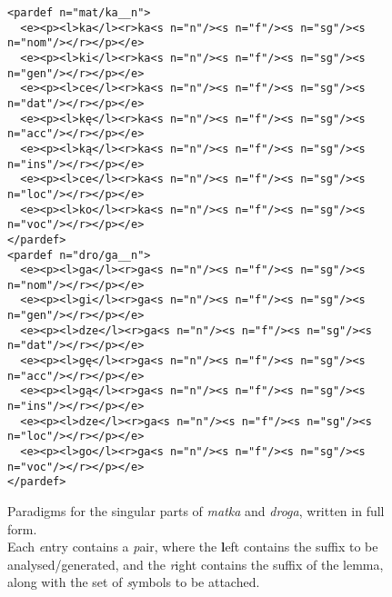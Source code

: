 \documentclass[11pt]{article}
\begin{document}
\begin{figure*}
\begin{small}
\begin{verbatim}
<pardef n="mat/ka__n">
  <e><p><l>ka</l><r>ka<s n="n"/><s n="f"/><s n="sg"/><s n="nom"/></r></p></e>
  <e><p><l>ki</l><r>ka<s n="n"/><s n="f"/><s n="sg"/><s n="gen"/></r></p></e>
  <e><p><l>ce</l><r>ka<s n="n"/><s n="f"/><s n="sg"/><s n="dat"/></r></p></e>
  <e><p><l>kę</l><r>ka<s n="n"/><s n="f"/><s n="sg"/><s n="acc"/></r></p></e>
  <e><p><l>ką</l><r>ka<s n="n"/><s n="f"/><s n="sg"/><s n="ins"/></r></p></e>
  <e><p><l>ce</l><r>ka<s n="n"/><s n="f"/><s n="sg"/><s n="loc"/></r></p></e>
  <e><p><l>ko</l><r>ka<s n="n"/><s n="f"/><s n="sg"/><s n="voc"/></r></p></e>
</pardef>
<pardef n="dro/ga__n">
  <e><p><l>ga</l><r>ga<s n="n"/><s n="f"/><s n="sg"/><s n="nom"/></r></p></e>
  <e><p><l>gi</l><r>ga<s n="n"/><s n="f"/><s n="sg"/><s n="gen"/></r></p></e>
  <e><p><l>dze</l><r>ga<s n="n"/><s n="f"/><s n="sg"/><s n="dat"/></r></p></e>
  <e><p><l>gę</l><r>ga<s n="n"/><s n="f"/><s n="sg"/><s n="acc"/></r></p></e>
  <e><p><l>gą</l><r>ga<s n="n"/><s n="f"/><s n="sg"/><s n="ins"/></r></p></e>
  <e><p><l>dze</l><r>ga<s n="n"/><s n="f"/><s n="sg"/><s n="loc"/></r></p></e>
  <e><p><l>go</l><r>ga<s n="n"/><s n="f"/><s n="sg"/><s n="voc"/></r></p></e>
</pardef>
\end{verbatim}
\end{small}
\caption{Paradigms for the singular parts of 
\emph{matka} and \emph{droga}, written in full form.
\label{fig:pardefs}\\
\small{Each \textit{e}ntry contains a \textit{p}air, where the \textbf{l}eft contains
the suffix to be analysed/generated, and the \textit{r}ight contains the
suffix of the lemma, along with the set of \textit{s}ymbols to be attached.}}
\end{figure*}
\end{document}
